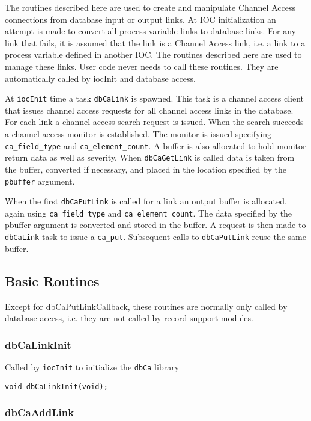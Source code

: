 The routines described here are used to create and manipulate Channel Access connections from database input or output links.
At IOC initialization an attempt is made to convert all process variable links to database links.
For any link that fails, it is assumed that the link is a Channel Access link, i.e. a link to a process variable defined in another IOC.
The routines described here are used to manage these links.
User code never needs to call these routines.
They are automatically called by iocInit and database access.

At \verb|iocInit| time a task \verb|dbCaLink| is spawned.
This task is a channel access client that issues channel access requests for all channel access links in the database.
For each link a channel access search request is issued.
When the search succeeds a channel access monitor is established.
The monitor is issued specifying \verb|ca_field_type| and \verb|ca_element_count|.
A buffer is also allocated to hold monitor return data as well as severity.
When \verb|dbCaGetLink| is called data is taken from the buffer, converted if necessary, and placed in the location specified by the \verb|pbuffer| 
argument.

When the first \verb|dbCaPutLink| is called for a link an output buffer is allocated, again using \verb|ca_field_type| and \verb|ca_element_count|.
The data specified by the pbuffer argument is converted and stored in the buffer.
A request is then made to \verb|dbCaLink| task to issue a \verb|ca_put|.
Subsequent calls to \verb|dbCaPutLink| reuse the same buffer.

\subsection{Basic Routines}

Except for dbCaPutLinkCallback, these routines are normally only called by database access, i.e. they are not called by record support modules.

\subsubsection{dbCaLinkInit}

Called by \verb|iocInit| to initialize the \verb|dbCa| library

\begin{verbatim}
void dbCaLinkInit(void);
\end{verbatim}

\subsubsection{dbCaAddLink}

